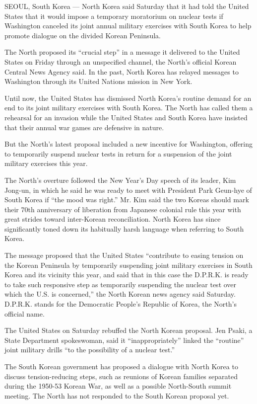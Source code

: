 SEOUL, South Korea --- North Korea said Saturday that it had told the
United States that it would impose a temporary moratorium on nuclear
tests if Washington canceled its joint annual military exercises with
South Korea to help promote dialogue on the divided Korean Peninsula.

The North proposed its ``crucial step'' in a message it delivered to the
United States on Friday through an unspecified channel, the North's
official Korean Central News Agency said. In the past, North Korea has
relayed messages to Washington through its United Nations mission in New
York.

Until now, the United States has dismissed North Korea's routine demand
for an end to its joint military exercises with South Korea. The North
has called them a rehearsal for an invasion while the United States and
South Korea have insisted that their annual war games are defensive in
nature.

But the North's latest proposal included a new incentive for Washington,
offering to temporarily suspend nuclear tests in return for a suspension
of the joint military exercises this year.

The North's overture followed the New Year's Day speech of its leader,
Kim Jong-un, in which he said he was ready to meet with President Park
Geun-hye of South Korea if ``the mood was right.'' Mr. Kim said the two
Koreas should mark their 70th anniversary of liberation from Japanese
colonial rule this year with great strides toward inter-Korean
reconciliation. North Korea has since significantly toned down its
habitually harsh language when referring to South Korea.

The message proposed that the United States ``contribute to easing
tension on the Korean Peninsula by temporarily suspending joint military
exercises in South Korea and its vicinity this year, and said that in
this case the D.P.R.K. is ready to take such responsive step as
temporarily suspending the nuclear test over which the U.S. is
concerned,'' the North Korean news agency said Saturday. D.P.R.K. stands
for the Democratic People's Republic of Korea, the North's official
name.

The United States on Saturday rebuffed the North Korean proposal. Jen
Psaki, a State Department spokeswoman, said it ``inappropriately''
linked the ``routine'' joint military drills ``to the possibility of a
nuclear test.''

The South Korean government has proposed a dialogue with North Korea to
discuss tension-reducing steps, such as reunions of Korean families
separated during the 1950-53 Korean War, as well as a possible
North-South summit meeting. The North has not responded to the South
Korean proposal yet.

